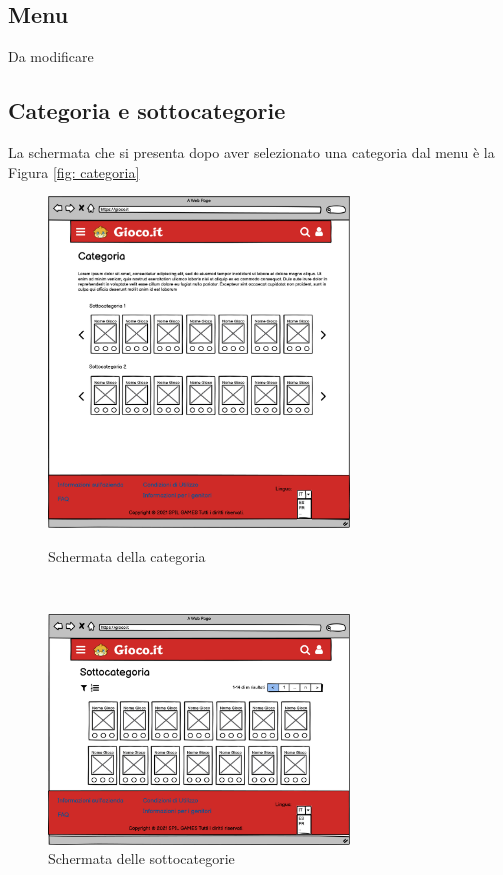 \documentclass[../Report.tex]{subfiles}
\begin{document}
    \subsection{Menu}
    Da modificare   
    
    \subsection{Categoria e sottocategorie}
    La schermata che si presenta dopo aver selezionato una categoria dal menu è la Figura \ref{fig: categoria}
    \begin{figure}[H]
        \hspace{-1.5cm}
        \begin{minipage}[b]{8cm}
            \centering
            \includegraphics[width=8cm]{WCategorySection.png}
            \caption{Schermata della categoria}
            \label{fig: categoria}
            \end{minipage}
            \ \hspace{2mm} \hspace{3mm} \
            \begin{minipage}[b]{8cm}
            \centering
            \includegraphics[width=8cm]{WSubcategorySection.png}
            \caption{Schermata delle sottocategorie}
            \label{fig: sottocategorie}
        \end{minipage}
    \end{figure}
\end{document}
